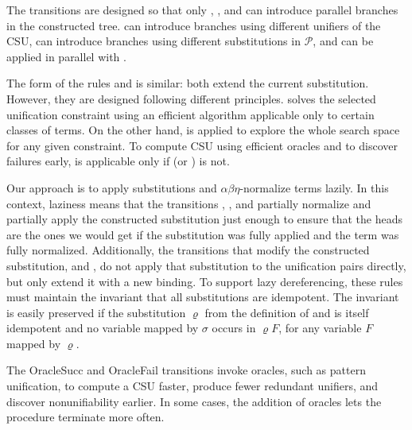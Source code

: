 %
The transitions are designed so that only ,
, and  can introduce parallel branches in the
constructed tree.  can introduce branches
using different unifiers of the CSU,  can introduce branches 
using different substitutions in $\mathcal{P}$, and 
can be applied in parallel with . 

The form of the rules  and  is similar: both
extend the current substitution. However,
they are designed following different principles.  solves
the selected unification constraint using an efficient algorithm applicable only
to certain classes of terms. On the other hand,  is applied to
explore the whole search space for any given constraint. To compute CSU using efficient oracles and to discover
failures early,  is applicable only if 
(or ) is not.

Our approach is to apply substitutions and $\alpha\beta\eta$-normalize terms
lazily. In this context, laziness means that the transitions
, , and
 partially normalize and partially apply the constructed
substitution just enough to ensure that the heads are the ones we would get if
the substitution was fully applied and the term was fully normalized. 
Additionally, the transitions that modify the constructed substitution,
 and , do not apply that substitution to the
unification pairs directly, but only extend it with a new binding. To support
lazy dereferencing, these rules must maintain the
invariant that all substitutions are idempotent. The invariant is easily
preserved if the substitution $\varrho$ from the definition of
 and  is itself idempotent and no variable
mapped by $\sigma$ occurs in $\varrho F$, for any variable $F$ mapped by
$\varrho$.

The \textsf{OracleSucc} and \textsf{OracleFail} transitions
invoke oracles, such as pattern unification,
to compute a CSU faster,
produce fewer redundant unifiers, and
discover nonunifiability earlier.
In some cases, the addition of oracles lets the procedure terminate more often.

